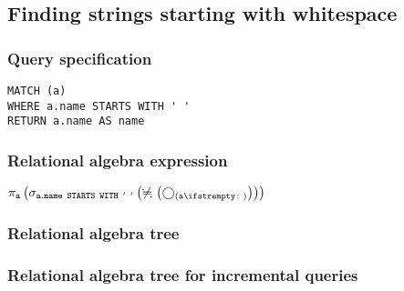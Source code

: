 \subsection{Finding strings starting with whitespace}

\subsubsection*{Query specification}

\begin{lstlisting}
MATCH (a)
WHERE a.name STARTS WITH ' '
RETURN a.name AS name
\end{lstlisting}

\subsubsection*{Relational algebra expression}

$\projection{\var{a}} \left(\selection{\mathtt{a.name~STARTS~WITH~'~'}} \left(\alldifferent{} \left(\getvertices{a}{}\right)\right)\right)$

\subsubsection*{Relational algebra tree}


\subsubsection*{Relational algebra tree for incremental queries}


